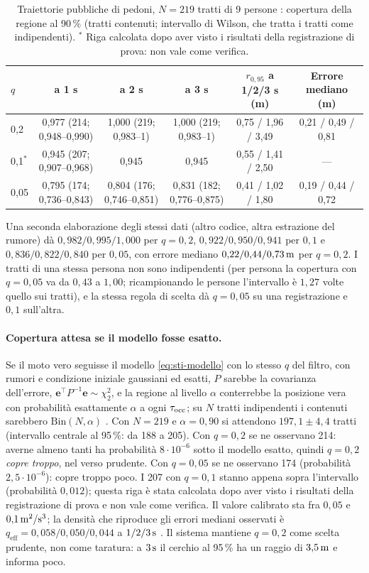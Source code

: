 \begin{table}[H]\centering\footnotesize
\caption{Traiettorie pubbliche di pedoni, $N=219$ tratti di 9 persone : copertura della regione al 90\,\% (tratti contenuti; intervallo di Wilson, che tratta i tratti come indipendenti). $^{\ast}$ Riga calcolata dopo aver visto i risultati della registrazione di prova: non vale come verifica.}\label{tab:sti-thor}
\begin{tabular}{lccccc}
\toprule
$q$ & a 1 s & a 2 s & a 3 s & $r_{0,95}$ a 1/2/3 s (m) & Errore mediano (m)\\
\midrule
0,2 & 0,977 (214; 0,948--0,990) & 1,000 (219; 0,983--1) & 1,000 (219; 0,983--1) & 0,75 / 1,96 / 3,49 & 0,21 / 0,49 / 0,81\\
0,1$^{\ast}$ & 0,945 (207; 0,907--0,968) & 0,945 & 0,945 & 0,55 / 1,41 / 2,50 & ---\\
0,05 & 0,795 (174; 0,736--0,843) & 0,804 (176; 0,746--0,851) & 0,831 (182; 0,776--0,875) & 0,41 / 1,02 / 1,80 & 0,19 / 0,44 / 0,72\\
\bottomrule
\end{tabular}
\end{table}
Una seconda elaborazione degli stessi dati (altro codice, altra estrazione del rumore) dà $0{,}982/0{,}995/1{,}000$ per $q=0{,}2$, $0{,}922/0{,}950/0{,}941$ per $0{,}1$ e $0{,}836/0{,}822/0{,}840$ per $0{,}05$, con errore mediano $0{,}22/0{,}44/0{,}73\,\mathrm{m}$ per $q=0{,}2$. I tratti di una stessa persona non sono indipendenti (per persona la copertura con $q=0{,}05$ va da $0{,}43$ a $1{,}00$; ricampionando le persone l'intervallo è $1{,}27$ volte quello sui tratti), e la stessa regola di scelta dà $q=0{,}05$ su una registrazione e $0{,}1$ sull'altra.

\paragraph{Copertura attesa se il modello fosse esatto.} Se il moto vero seguisse il modello \eqref{eq:sti-modello} con lo stesso $q$ del filtro, con rumori e condizione iniziale gaussiani ed esatti, $P$ sarebbe la covarianza dell'errore, $\mathbf e^{\top}P^{-1}\mathbf e\sim\chi^2_2$, e la regione al livello $\alpha$ conterrebbe la posizione vera con probabilità esattamente $\alpha$ a ogni $\tau_{\mathrm{occ}}$; su $N$ tratti indipendenti i contenuti sarebbero $\mathrm{Bin}(N,\alpha)$ . Con $N=219$ e $\alpha=0{,}90$ si attendono $197{,}1\pm4{,}4$ tratti (intervallo centrale al 95\,\%: da 188 a 205). Con $q=0{,}2$ se ne osservano 214: averne almeno tanti ha probabilità $8\cdot10^{-6}$ sotto il modello esatto, quindi $q=0{,}2$ \emph{copre troppo}, nel verso prudente. Con $q=0{,}05$ se ne osservano 174 (probabilità $2{,}5\cdot10^{-6}$): copre troppo poco. I 207 con $q=0{,}1$ stanno appena sopra l'intervallo (probabilità $0{,}012$); questa riga è stata calcolata dopo aver visto i risultati della registrazione di prova e non vale come verifica. Il valore calibrato sta fra $0{,}05$ e $0{,}1\,\mathrm{m^2/s^3}$; la densità che riproduce gli errori mediani osservati è $q_{\mathrm{eff}}=0{,}058/0{,}050/0{,}044$ a $1/2/3\,\mathrm{s}$ . Il sistema mantiene $q=0{,}2$ come scelta prudente, non come taratura: a $3\,\mathrm{s}$ il cerchio al 95\,\% ha un raggio di $3{,}5\,\mathrm{m}$ e informa poco.

